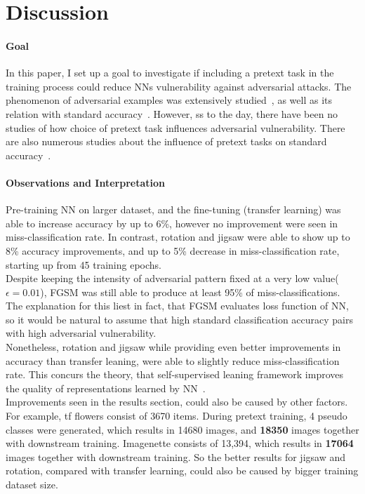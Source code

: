 \section{Discussion}

\paragraph{Goal}In this paper, I set up a goal to investigate if including a pretext task in the training process could reduce NNs
vulnerability against adversarial attacks.
The phenomenon of adversarial examples was extensively studied~\cite{ilyas2019adversarial, DBLP:journals/corr/abs-1802-08195, goodfellow2015explaining},
as well as its relation with standard accuracy~\cite{https://doi.org/10.48550/arxiv.1805.12152}.
However, ss to the day, there have been no studies of how choice of pretext task influences adversarial vulnerability.
There are also numerous studies about the influence of pretext tasks on standard
accuracy~\cite{DBLP:journals/corr/abs-1912-01991, DBLP:journals/corr/NorooziF16, kolesnikov2019revisiting}.


\paragraph{Observations and Interpretation}
Pre-training NN on larger dataset, and the fine-tuning (transfer learning) was able to increase accuracy by up to 6\%,
however no improvement were seen in miss-classification rate.
In contrast, rotation and jigsaw were able to show up to 8\% accuracy improvements,
and up to 5\% decrease in miss-classification  rate, starting up from 45 training epochs.
\\
Despite keeping the intensity of adversarial pattern fixed at a very low value($\epsilon = 0.01$),
FGSM was still able to produce at least 95\% of miss-classifications.
The explanation for this liest in fact, that FGSM evaluates loss function of NN,
so it would be natural to assume that high standard classification accuracy pairs with high adversarial vulnerability.
\\
Nonetheless, rotation and jigsaw while providing even better improvements in accuracy than transfer leaning,
were able to slightly reduce miss-classification rate.
This concurs the theory, that self-supervised leaning framework improves the quality of representations learned by NN~\cite{kolesnikov2019revisiting}.
\\
Improvements seen in the results section, could also be caused by other factors.
For example, tf flowers consist of 3670 items.
During pretext training, 4 pseudo classes were generated,
which results in 14680 images, and \textbf{18350} images together with downstream training.
Imagenette consists of 13,394, which results in \textbf{17064} images together with downstream training.
So the better results for jigsaw and rotation, compared with transfer learning,
could also be caused by bigger training dataset size.

